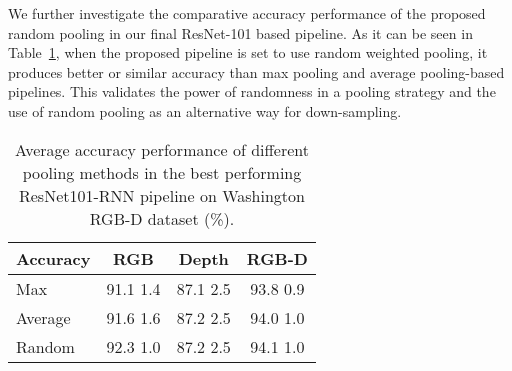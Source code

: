 We further investigate the comparative accuracy performance of the proposed random pooling in our final ResNet-101 based pipeline. As it can be seen in Table~\ref{table:poolingComparison}, when the proposed pipeline is set to use random weighted pooling, it produces better or similar accuracy than max pooling and average pooling-based pipelines. This validates the power of randomness in a pooling strategy and the use of random pooling as an alternative way for down-sampling.
\begin{table}[!h]
	\caption{Average accuracy performance of different pooling methods in the best performing ResNet101-RNN pipeline on Washington RGB-D dataset (\%).}
	\begin{center}
		\setlength{\tabcolsep}{0.9em} \def\arraystretch{1.2}
		\begin{adjustbox}{width=0.75\columnwidth}
			\begin{tabular}{ lccc }
				\hline
				Accuracy			& RGB 								& Depth 							& RGB-D \\ \hline \hline
				Max   				& 91.1  1.4 				& 87.1  2.5 	 			& 93.8  0.9 		\\ Average    			& 91.6  1.6 				& 87.2  2.5 	 			& 94.0  1.0 		\\ Random   			& 92.3  1.0 				& 87.2  2.5 	 			& 94.1  1.0 		\\ \hline
			\end{tabular}
		\end{adjustbox}
		\label{table:poolingComparison}
	\end{center}
\end{table}

